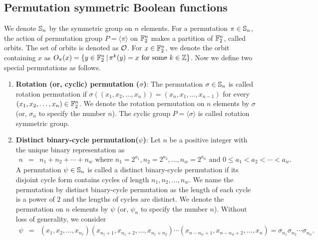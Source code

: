 \documentclass{llncs}
\begin{document}
\subsection{Permutation symmetric Boolean functions}\label{ssec:PSBF}
We denote $\mathbb{S}_n$ by the symmetric group on $n$ elements. For a permutation $\pi\in \mathbb{S}_n$, the action of permutation group $P = \langle \pi \rangle$ on $\mathbb{F}_2^n$ makes a partition of $\mathbb{F}_2^n$, called orbits. The set of orbits is denoted as $\mathcal{O}$. For $x \in \mathbb{F}_2^n$, we denote the orbit containing $x$ as
$O_{\pi}(x) = \{y \in \mathbb{F}_2^n \,| \, \pi^k(y) = x \text{ for some } k \in \mathbb{Z}\}$. Now we define two special permutations as follows.
\begin{enumerate}
\item {\bf Rotation (or, cyclic) permutation ($\sigma$)}: The permutation $\sigma \in \mathbb{S}_n$ is called rotation permutation if $\sigma((x_1,x_2,\ldots,x_n)) = (x_n,x_1,\ldots,x_{n-1})$  for every $(x_1,x_2,\ldots,x_n) \in \mathbb{F}_2^n$. We denote the rotation permutation on $n$ elements by $\sigma$ (or, $\sigma_n$ to specify the number $n$).
The cyclic group $P = \langle \sigma \rangle$ is called rotation symmetric group.

\item {\bf Distinct binary-cycle permutation($\psi$)}: 
Let $n$ be a positive integer with the unique binary representation as
\begin{eqnarray}\label{eqn:binn}
n & = & n_1 + n_2 + \cdots + n_w \text{ where } n_1 = 2^{a_1}, n_2 = 2^{a_2}, \ldots, n_w = 2^{a_w} \text{ and } 0 \leq a_1 < a_2 < \cdots < a_w.
\end{eqnarray}
A permutation $\psi \in \mathbb{S}_n$ is called a distinct binary-cycle permutation if its disjoint cycle form contains cycles of length $n_1, n_2,  \ldots, n_w$.
We name the permutation by distinct binary-cycle permutation as the length of each cycle is a power of $2$ and the lengths of cycles are distinct.
We denote the permutation on $n$ elements by $\psi$ (or, $\psi_n$ to specify the number $n$).
Without loss of generality, we consider 
\begin{eqnarray}\label{eqn:cycperm}
\psi & = & (x_1, x_2, \ldots, x_{n_1}) (x_{n_1+1}, x_{n_1+2}, \ldots, x_{n_1+n_2})\cdots (x_{n-n_w+1}, x_{n-n_w+2}, \ldots, x_n) = \sigma_{n_1}\sigma_{n_2} \cdots\sigma_{n_w}.
\end{eqnarray}
\end{enumerate}
\end{document}
